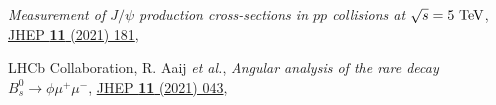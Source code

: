 \begin{cvcontent}
\begin{enumerate}[label={[\arabic*]}, leftmargin=1.5cm]
    \emph{Measurement of $J/\psi$ production cross-sections in $pp$ collisions at $\sqrt{s}=5~\rm{TeV}$},
    \href{http://dx.doi.org/10.1007/JHEP11(2021)181}{JHEP \textbf{11} (2021) 181},
    \sloppy
    \item LHCb Collaboration, R. Aaij \emph{et al.}, 
    \emph{Angular analysis of the rare decay $B_s^0 \to \phi \mu^+ \mu^-$},
    \href{http://dx.doi.org/10.1007/JHEP11(2021)043}{JHEP \textbf{11} (2021) 043},
  \end{enumerate}
\end{cvcontent}